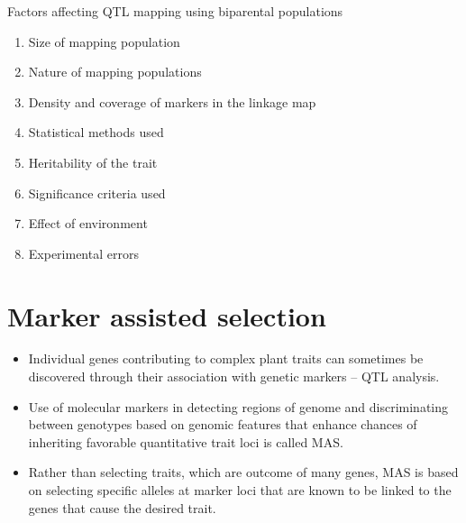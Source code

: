 \documentclass[
  ignorenonframetext,
  aspectratio=169]{beamer}
\providecommand{\tightlist}{%
  \setlength{\itemsep}{0pt}\setlength{\parskip}{0pt}}
\begin{document}
\begin{frame}{Factors affecting QTL mapping using biparental
populations}
\protect\hypertarget{factors-affecting-qtl-mapping-using-biparental-populations}{}
\begin{enumerate}
\tightlist
\item
  Size of mapping population
\item
  Nature of mapping populations
\item
  Density and coverage of markers in the linkage map
\item
  Statistical methods used
\item
  Heritability of the trait
\item
  Significance criteria used
\item
  Effect of environment
\item
  Experimental errors
\end{enumerate}
\end{frame}

\hypertarget{marker-assisted-selection}{%
\section{Marker assisted selection}\label{marker-assisted-selection}}

\begin{frame}{}
\protect\hypertarget{section-7}{}
\begin{itemize}
\tightlist
\item
  Individual genes contributing to complex plant traits can sometimes be
  discovered through their association with genetic markers --
  \alert{QTL analysis}.
\item
  Use of molecular markers in detecting regions of genome and
  discriminating between genotypes based on genomic features that
  enhance chances of inheriting favorable quantitative trait loci is
  called MAS.
\item
  Rather than selecting traits, which are outcome of many genes, MAS is
  based on selecting specific alleles at marker loci that are known to
  be linked to the genes that cause the desired trait.
\end{itemize}
\end{frame}
\end{document}
